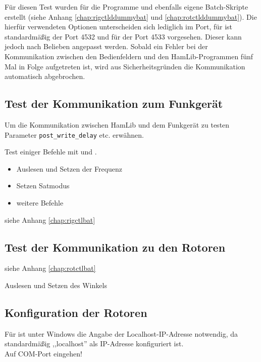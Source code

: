 Für diesen Test wurden für die Programme  und  ebenfalls eigene Batch-Skripte erstellt (siehe Anhang \ref{chap:rigctlddummybat} und \ref{chap:rotctlddummybat}). Die hierfür verwendeten Optionen unterscheiden sich lediglich im Port, für  ist standardmäßig der Port 4532 und für  der Port 4533 vorgesehen. Dieser kann jedoch nach Belieben angepasst werden.\newpar
Sobald ein Fehler bei der Kommunikation zwischen den Bedienfeldern und den HamLib-Programmen fünf Mal in Folge aufgetreten ist, wird aus Sicherheitsgründen die Kommunikation automatisch abgebrochen.

\clearpage

\subsection{Test der Kommunikation zum Funkgerät}

Um die Kommunikation zwischen HamLib und dem Funkgerät zu testen
Parameter \texttt{post\_write\_delay} etc. erwähnen.\newpar

Test einiger Befehle mit  und . 

\begin{itemize}
	\parskip0pt
	\item Auslesen und Setzen der Frequenz
	\item Setzen Satmodus
	\item weitere Befehle
\end{itemize}

siehe Anhang \ref{chap:rigctlbat}

\subsection{Test der Kommunikation zu den Rotoren}

siehe Anhang \ref{chap:rotctlbat}

Auslesen und Setzen des Winkels

\clearpage

\subsection{Konfiguration der Rotoren}
\label{chap:configinterfaces} \label{configinterfaces}	

Für  ist unter Windows die Angabe der Localhost-IP-Adresse notwendig, da standardmäßig ,,localhost'' als IP-Adresse konfiguriert ist.\\
Auf COM-Port eingehen!\\


